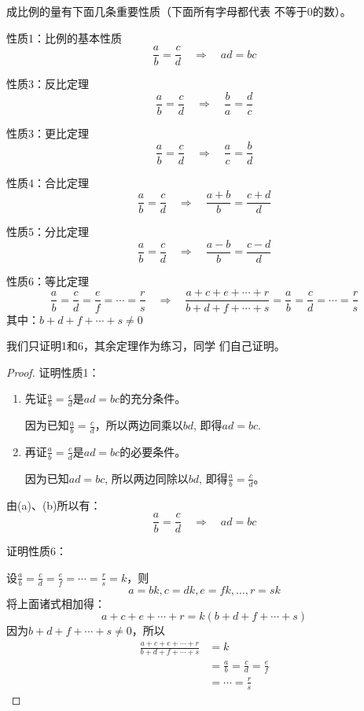 成比例的量有下面几条重要性质（下面所有字母都代表
不等于0的数）。

\begin{blk}{性质1：比例的基本性质}
\[\frac{a}{b}=\frac{c}{d}\quad \Rightarrow\quad ad=bc\]    
\end{blk}

\begin{blk}{性质3：反比定理}
    \[\frac{a}{b}=\frac{c}{d}\quad \Rightarrow\quad \frac{b}{a}=\frac{d}{c}\]       
\end{blk}

\begin{blk}{性质3：更比定理}
    \[\frac{a}{b}=\frac{c}{d}\quad \Rightarrow\quad \frac{a}{c}=\frac{b}{d}\] 
\end{blk}

\begin{blk}{性质4：合比定理}
    \[\frac{a}{b}=\frac{c}{d}\quad \Rightarrow\quad \frac{a+b}{b}=\frac{c+d}{d}\] 
\end{blk}

\begin{blk}{性质5：分比定理}
    \[\frac{a}{b}=\frac{c}{d}\quad \Rightarrow\quad \frac{a-b}{b}=\frac{c-d}{d}\] 
\end{blk}

\begin{blk}{性质6：等比定理}
    \[\frac{a}{b}=\frac{c}{d}=\frac{e}{f}=\cdots=\frac{r}{s}\quad \Rightarrow\quad \frac{a+c+e+\cdots+r}{b+d+f+\cdots+s}=\frac{a}{b}=\frac{c}{d}=\cdots=\frac{r}{s}\] 
其中：$b+d+f+\cdots+s\ne 0$
\end{blk}

我们只证明1和6，其余定理作为练习，同学
们自己证明。

\begin{proof}
证明性质1：
\begin{enumerate}
    \item 先证$\frac{a}{b}=\frac{c}{d}$是$ad=bc$的充分条件。

    因为已知$\frac{a}{b}=\frac{c}{d}$，所以两边同乘以$bd$, 即得$ad=bc$.
\item     再证$\frac{a}{b}=\frac{c}{d}$是$ad=bc$的必要条件。

因为已知$ad=bc$, 所以两边同除以$bd$, 即得$\frac{a}{b}=\frac{c}{d}$。
\end{enumerate}

由(a)、(b)所以有：
\[\frac{a}{b}=\frac{c}{d}\quad \Rightarrow\quad ad=bc\]    

证明性质6：

设$\frac{a}{b}=\frac{c}{d}=\frac{e}{f}=\cdots=\frac{r}{s}=k$，则
\[a=bk, c=dk, e=fk, \ldots, r=sk\] 
将上面诸式相加得：
\[a+c+e+\cdots+r=k(b+d+f+\cdots+s)\]
因为$b+d+f+\cdots+s\ne 0$，所以
\[\begin{split}
    \frac{a+c+e+\cdots+r}{b+d+f+\cdots+s}&=k\\
    &=\frac{a}{b}=\frac{c}{d}=\frac{e}{f}\\
    &=\cdots=\frac{r}{s}
\end{split}
    \]
\end{proof}


